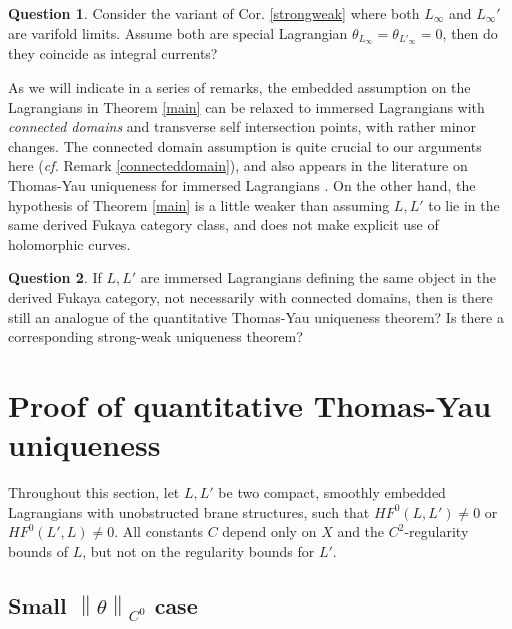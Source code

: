 \documentclass[a4paper]{article}
\theoremstyle{definition}
\newtheorem{Question}{Question}
\newcommand{\cf}{\emph{cf.} }
\newcommand{\norm}[1]{\left\lVert#1\right\rVert}
\begin{document}
\begin{Question}
Consider the variant of Cor. \ref{strongweak} where both $L_\infty$ and $L_\infty'$ are varifold limits. Assume both are special Lagrangian $\theta_{L_\infty}=\theta_{L'_\infty}=0$, then do they coincide as integral currents?
\end{Question}








As we will indicate in a series of remarks, the embedded assumption on the Lagrangians in Theorem \ref{main} can be relaxed to immersed Lagrangians with \emph{connected domains} and transverse self intersection points, with rather minor changes. The connected domain assumption is quite crucial to our arguments here (\cf Remark \ref{connecteddomain}), and also appears in the literature on Thomas-Yau uniqueness for immersed Lagrangians \cite{Imagi}. On the other hand, the hypothesis of Theorem \ref{main} is a little weaker than assuming $L,L'$ to lie in the same derived Fukaya category class, and does not make explicit use of holomorphic curves. 


\begin{Question}
If $L,L'$ are immersed Lagrangians defining the same object in the derived Fukaya category, not necessarily with connected domains, then is there still an analogue of the quantitative Thomas-Yau uniqueness theorem? Is there a corresponding strong-weak uniqueness theorem?	
\end{Question}







\section{Proof of quantitative Thomas-Yau uniqueness}



Throughout this section,
let $L, L'$ be two compact, smoothly embedded Lagrangians with unobstructed brane structures, such that $HF^0(L, L')\neq 0$ or $HF^0(L',L)\neq 0$.  All constants $C$ depend only on $X$ and the $C^2$-regularity bounds of $L$, but not on the regularity bounds for $L'$.





\subsection{Small $\norm{\theta}_{C^0}$ case}
\end{document}
